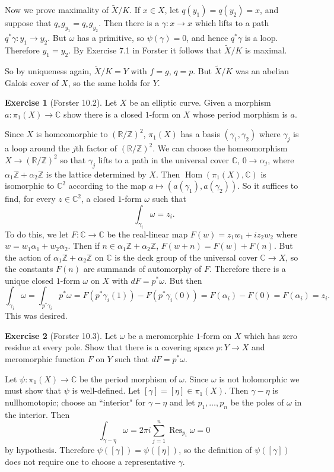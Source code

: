 \documentclass[10pt]{article}
\newcommand{\ZZ}{\mathbb{Z}}
\newcommand{\RR}{\mathbb{R}}
\newcommand{\CC}{\mathbb{C}}
\newcommand{\Hom}{\operatorname{Hom}}
\DeclareMathOperator*{\Res}{Res}
\theoremstyle{definition}
\newtheorem{exer}{Exercise}
\begin{document}
Now we prove maximality of $\tilde X/K$. If $x \in X$, let $q(y_1) = q(y_2) = x$, and suppose that $q_*g_{y_1} = q_*g_{y_2}$.
Then there is a $\gamma: x \to x$ which lifts to a path $q^*\gamma: y_1 \to y_2$.
But $\omega$ has a primitive, so $\psi(\gamma) = 0$, and hence $q^*\gamma$ is a loop.
Therefore $y_1 = y_2$. By Exercise 7.1 in Forster it follows that $\tilde X/K$ is maximal.

So by uniqueness again, $\tilde X/K = Y$ with $f = g$, $q = p$. But $\tilde X/K$ was an abelian Galois cover of $X$, so the same holds for $Y$.

\begin{exer}[Forster 10.2]
Let $X$ be an elliptic curve. Given a morphism $a: \pi_1(X) \to \CC$ show there is a closed $1$-form on $X$ whose period morphism is $a$.
\end{exer}

Since $X$ is homeomorphic to $(\RR/\ZZ)^2$, $\pi_1(X)$ has a basis $(\gamma_1,\gamma_2)$ where $\gamma_j$ is a loop around the $j$th factor of $(\RR/\ZZ)^2$.
We can choose the homeomorphism $X \to (\RR/\ZZ)^2$ so that $\gamma_j$ lifts to a path in the universal cover $\CC$, $0 \to \alpha_j$, where $\alpha_1\ZZ + \alpha_2\ZZ$ is the lattice determined by $X$.
Then $\Hom(\pi_1(X), \CC)$ is isomorphic to $\CC^2$ according to the map $a \mapsto (a(\gamma_1), a(\gamma_2))$.
So it suffices to find, for every $z \in \CC^2$, a closed $1$-form $\omega$ such that
$$\int_{\gamma_i} \omega = z_i.$$
To do this, we let $F: \CC \to \CC$ be the real-linear map $F(w) = z_1w_1 + iz_2w_2$ where $w = w_1\alpha_1 + w_2\alpha_2$. Then if $n \in \alpha_1\ZZ + \alpha_2\ZZ$, $F(w + n) = F(w) + F(n)$.
But the action of $\alpha_1\ZZ + \alpha_2\ZZ$ on $\CC$ is the deck group of the universal cover $\CC \to X$, so the constants $F(n)$ are summands of automorphy of $F$.
Therefore there is a unique closed $1$-form $\omega$ on $X$ with $dF = p^*\omega$.
But then
$$\int_{\gamma_i} \omega = \int_{p^*\gamma_i} p^*\omega = F(p^*\gamma_i(1)) - F(p^*\gamma_i(0)) = F(\alpha_i) - F(0) = F(\alpha_i) = z_i.$$
This was desired.

\begin{exer}[Forster 10.3]
Let $\omega$ be a meromorphic $1$-form on $X$ which has zero residue at every pole. Show that there is a covering space $p: Y \to X$ and meromorphic function $F$ on $Y$ such that $dF = p^*\omega$.
\end{exer}

Let $\psi: \pi_1(X) \to \CC$ be the period morphism of $\omega$.
Since $\omega$ is not holomorphic we must show that $\psi$ is well-defined.
Let $[\gamma] = [\eta] \in \pi_1(X)$. Then $\gamma - \eta$ is nullhomotopic; choose an ``interior" for $\gamma - \eta$ and let $p_1, \dots, p_n$ be the poles of $\omega$ in the interior. Then
$$\int_{\gamma - \eta} \omega = 2\pi i\sum_{j=1}^n \Res_{p_i} \omega = 0$$
by hypothesis. Therefore $\psi([\gamma]) = \psi([\eta])$, so the definition of $\psi([\gamma])$ does not require one to choose a representative $\gamma$.
\end{document}
